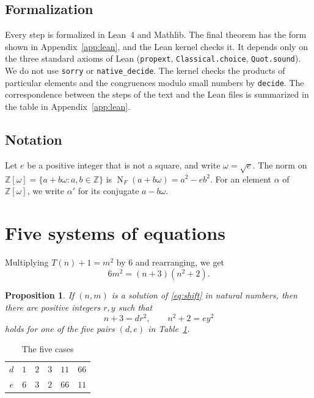 \documentclass[a4paper,11pt]{article}
\theoremstyle{plain}
\newtheorem{proposition}[theorem]{Proposition}
\theoremstyle{definition}
\theoremstyle{remark}
\numberwithin{equation}{section}
\numberwithin{table}{section}
\newcommand{\Z}{\mathbb{Z}}
\newcommand{\NF}{\operatorname{N}_F}
\newcommand{\lean}[1]{\texttt{#1}}
\begin{document}
\subsection{Formalization}

Every step is formalized in Lean~4 and Mathlib.
The final theorem has the form shown in Appendix~\ref{app:lean}, and the Lean kernel checks it.
It depends only on the three standard axioms of Lean (\lean{propext}, \lean{Classical.choice}, \lean{Quot.sound}).
We do not use \lean{sorry} or \lean{native\_decide}.
The kernel checks the products of particular elements and the congruences modulo small numbers by \lean{decide}.
The correspondence between the steps of the text and the Lean files is summarized in the table in Appendix~\ref{app:lean}.

\subsection{Notation}

Let $e$ be a positive integer that is not a square, and write $\omega=\sqrt e$.
The norm on $\Z[\omega]=\{a+b\omega : a,b\in\Z\}$ is $\NF(a+b\omega)=a^2-eb^2$.
For an element $\alpha$ of $\Z[\omega]$, we write $\alpha'$ for its conjugate $a-b\omega$.

\section{Five systems of equations}\label{sec:branches}

Multiplying $T(n)+1=m^2$ by $6$ and rearranging, we get
\begin{equation}\label{eq:shift}
6m^2=(n+3)(n^2+2).
\end{equation}

\begin{proposition}\label{prop:branches}
If $(n,m)$ is a solution of \eqref{eq:shift} in natural numbers, then there are positive integers $r,y$ such that
\begin{equation}\label{eq:pair}
n+3=dr^2,\qquad n^2+2=ey^2
\end{equation}
holds for one of the five pairs $(d,e)$ in Table~\ref{tab:branches}.
\end{proposition}

\begin{table}[htbp]
\centering
\caption{The five cases}\label{tab:branches}
\begin{tabular}{c|ccccc}
\toprule
$d$ & $1$ & $2$ & $3$ & $11$ & $66$\\
$e$ & $6$ & $3$ & $2$ & $66$ & $11$\\
\bottomrule
\end{tabular}
\end{table}
\end{document}
